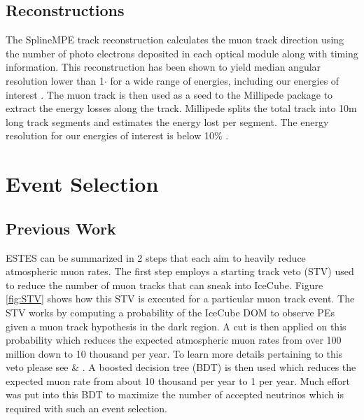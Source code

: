 \documentclass{PoS}
\begin{document}
\subsection{Reconstructions}\label{sec:Reco}
The SplineMPE track reconstruction calculates the muon track direction using the number of photo electrons deposited in each optical module along with timing information. This reconstruction has been shown to yield median angular resolution lower than 1$\cdot$ for a wide range of energies, including our energies of interest \cite{angular_res}. The muon track is then used as a seed to the Millipede package to extract the energy losses along the track. Millipede splits the total track into 10m long track segments and estimates the energy lost per segment. The energy resolution for our energies of interest is below 10$\%$ \cite{energy_res}.


\section{Event Selection}\label{sec:ESTES}
\subsection{Previous Work}\label{sec:ESTES_startingtrack}
ESTES can be summarized in 2 steps that each aim to heavily reduce atmospheric muon rates. The first step employs a starting track veto (STV) used to reduce the number of muon tracks that can sneak into IceCube. Figure \ref{fig:STV} shows how this STV is executed for a particular muon track event. The STV works by computing a probability of the IceCube DOM to observe PEs given a muon track hypothesis in the dark region. A cut is then applied on this probability which reduces the expected atmospheric muon rates from over 100 million down to 10 thousand per year. To learn more details pertaining to this veto please see \cite{Kyle:ESTES} \& \cite{Mancina:ESTES}. A boosted decision tree (BDT) is then used which reduces the expected muon rate from about 10 thousand per year to 1 per year. Much effort was put into this BDT to maximize the number of accepted neutrinos which is required with such an event selection.
\end{document}
